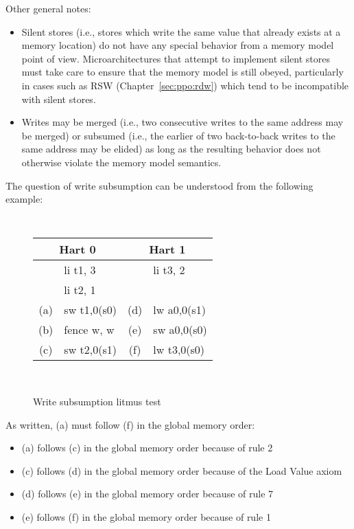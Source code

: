 Other general notes:

\begin{itemize}
  \item Silent stores (i.e., stores which write the same value that already exists at a memory location) do not have any special behavior from a memory model point of view.  Microarchitectures that attempt to implement silent stores must take care to ensure that the memory model is still obeyed, particularly in cases such as RSW (Chapter~\ref{sec:ppo:rdw}) which tend to be incompatible with silent stores.
  \item Writes may be merged (i.e., two consecutive writes to the same address may be merged) or subsumed (i.e., the earlier of two back-to-back writes to the same address may be elided) as long as the resulting behavior does not otherwise violate the memory model semantics.
\end{itemize}

The question of write subsumption can be understood from the following example:
\begin{figure}[h!]
  \centering
  {
    \tt\small
    \begin{tabular}{cl||cl}
    \multicolumn{2}{c}{Hart 0} & \multicolumn{2}{c}{Hart 1} \\
    \hline
        & li t1, 3    &     & li  t3, 2    \\
        & li t2, 1    &     &              \\
    (a) & sw t1,0(s0) & (d) & lw  a0,0(s1) \\
    (b) & fence w, w  & (e) & sw  a0,0(s0) \\
    (c) & sw t2,0(s1) & (f) & lw  t3,0(s0) \\
    \end{tabular}
  }
  ~~~~
  \diagram
  \caption{Write subsumption litmus test}
  \label{fig:litmus:subsumption}
\end{figure}

As written, (a) must follow (f) in the global memory order:
\begin{itemize}
  \item (a) follows (c) in the global memory order because of rule 2
  \item (c) follows (d) in the global memory order because of the Load Value axiom
  \item (d) follows (e) in the global memory order because of rule 7
  \item (e) follows (f) in the global memory order because of rule 1
\end{itemize}

